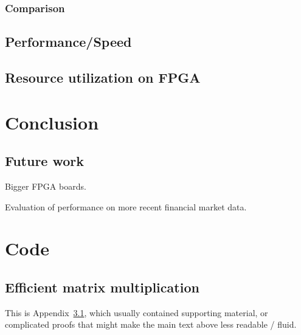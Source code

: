 \documentclass[a4paper, twoside]{report}
\theoremstyle{definition}
\numberwithin{equation}{section}
\begin{document}
\subsection{Comparison}


\section{Performance/Speed}





\section{Resource utilization on FPGA}



\newpage
\chapter*{Conclusion}

\section{Future work}
Bigger FPGA boards.

Evaluation of performance on more recent financial market data.


\newpage
\appendix
\chapter{Code}
\section{Efficient matrix multiplication}\label{app:Appendix}
This is Appendix~\ref{app:Appendix}, which usually contained supporting material,
or complicated proofs that might make the main text above less readable / fluid.



\end{document}
